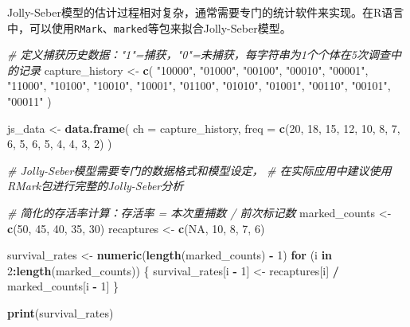 \documentclass[
  twoside,12pt,fontset=none]{ctexbook}
\newenvironment{Shaded}{\begin{snugshade}}{\end{snugshade}}
\newcommand{\AttributeTok}[1]{\textcolor[rgb]{0.13,0.29,0.53}{#1}}
\newcommand{\CommentTok}[1]{\textcolor[rgb]{0.56,0.35,0.01}{\textit{#1}}}
\newcommand{\ConstantTok}[1]{\textcolor[rgb]{0.56,0.35,0.01}{#1}}
\newcommand{\ControlFlowTok}[1]{\textcolor[rgb]{0.13,0.29,0.53}{\textbf{#1}}}
\newcommand{\DecValTok}[1]{\textcolor[rgb]{0.00,0.00,0.81}{#1}}
\newcommand{\FunctionTok}[1]{\textcolor[rgb]{0.13,0.29,0.53}{\textbf{#1}}}
\newcommand{\NormalTok}[1]{#1}
\newcommand{\OtherTok}[1]{\textcolor[rgb]{0.56,0.35,0.01}{#1}}
\newcommand{\SpecialCharTok}[1]{\textcolor[rgb]{0.81,0.36,0.00}{\textbf{#1}}}
\newcommand{\StringTok}[1]{\textcolor[rgb]{0.31,0.60,0.02}{#1}}
\begin{document}
Jolly-Seber模型的估计过程相对复杂，通常需要专门的统计软件来实现。在R语言中，可以使用\texttt{RMark}、\texttt{marked}等包来拟合Jolly-Seber模型。

\begin{Shaded}
\begin{Highlighting}[]
\CommentTok{\# 定义捕获历史数据："1"=捕获，"0"=未捕获，每字符串为1个个体在5次调查中的记录}
\NormalTok{capture\_history }\OtherTok{\textless{}{-}} \FunctionTok{c}\NormalTok{(}
  \StringTok{"10000"}\NormalTok{, }\StringTok{"01000"}\NormalTok{, }\StringTok{"00100"}\NormalTok{, }\StringTok{"00010"}\NormalTok{, }\StringTok{"00001"}\NormalTok{,}
  \StringTok{"11000"}\NormalTok{, }\StringTok{"10100"}\NormalTok{, }\StringTok{"10010"}\NormalTok{, }\StringTok{"10001"}\NormalTok{,}
  \StringTok{"01100"}\NormalTok{, }\StringTok{"01010"}\NormalTok{, }\StringTok{"01001"}\NormalTok{,}
  \StringTok{"00110"}\NormalTok{, }\StringTok{"00101"}\NormalTok{,}
  \StringTok{"00011"}
\NormalTok{)}

\NormalTok{js\_data }\OtherTok{\textless{}{-}} \FunctionTok{data.frame}\NormalTok{(}
  \AttributeTok{ch =}\NormalTok{ capture\_history,}
  \AttributeTok{freq =} \FunctionTok{c}\NormalTok{(}\DecValTok{20}\NormalTok{, }\DecValTok{18}\NormalTok{, }\DecValTok{15}\NormalTok{, }\DecValTok{12}\NormalTok{, }\DecValTok{10}\NormalTok{, }\DecValTok{8}\NormalTok{, }\DecValTok{7}\NormalTok{, }\DecValTok{6}\NormalTok{, }\DecValTok{5}\NormalTok{, }\DecValTok{6}\NormalTok{, }\DecValTok{5}\NormalTok{, }\DecValTok{4}\NormalTok{, }\DecValTok{4}\NormalTok{, }\DecValTok{3}\NormalTok{, }\DecValTok{2}\NormalTok{)}
\NormalTok{)}

\CommentTok{\# Jolly{-}Seber模型需要专门的数据格式和模型设定，}
\CommentTok{\# 在实际应用中建议使用RMark包进行完整的Jolly{-}Seber分析}

\CommentTok{\# 简化的存活率计算：存活率 = 本次重捕数 / 前次标记数}
\NormalTok{marked\_counts }\OtherTok{\textless{}{-}} \FunctionTok{c}\NormalTok{(}\DecValTok{50}\NormalTok{, }\DecValTok{45}\NormalTok{, }\DecValTok{40}\NormalTok{, }\DecValTok{35}\NormalTok{, }\DecValTok{30}\NormalTok{)}
\NormalTok{recaptures }\OtherTok{\textless{}{-}} \FunctionTok{c}\NormalTok{(}\ConstantTok{NA}\NormalTok{, }\DecValTok{10}\NormalTok{, }\DecValTok{8}\NormalTok{, }\DecValTok{7}\NormalTok{, }\DecValTok{6}\NormalTok{)}

\NormalTok{survival\_rates }\OtherTok{\textless{}{-}} \FunctionTok{numeric}\NormalTok{(}\FunctionTok{length}\NormalTok{(marked\_counts) }\SpecialCharTok{{-}} \DecValTok{1}\NormalTok{)}
\ControlFlowTok{for}\NormalTok{ (i }\ControlFlowTok{in} \DecValTok{2}\SpecialCharTok{:}\FunctionTok{length}\NormalTok{(marked\_counts)) \{}
\NormalTok{  survival\_rates[i }\SpecialCharTok{{-}} \DecValTok{1}\NormalTok{] }\OtherTok{\textless{}{-}}\NormalTok{ recaptures[i] }\SpecialCharTok{/}\NormalTok{ marked\_counts[i }\SpecialCharTok{{-}} \DecValTok{1}\NormalTok{]}
\NormalTok{\}}

\FunctionTok{print}\NormalTok{(survival\_rates)}
\end{Highlighting}
\end{Shaded}
\end{document}
